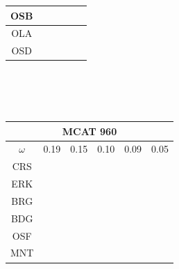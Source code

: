 \documentclass[12pt]{article}
\begin{document}
\begin{landscape}
\begin{figure}
{\begin{minipage}[c]{0.3\textwidth}
\begin{tabular}{|c|c|c|c|c|c|}
        OSB&\cellcolor[HTML]{FF7F00}&\cellcolor[HTML]{4DAF4A}&\cellcolor[HTML]{984EA3}&\cellcolor[HTML]{984EA3}&\cellcolor[HTML]{984EA3}\\ \hline %
        OLA&\cellcolor[HTML]{FF7F00}&\cellcolor[HTML]{4DAF4A}&\cellcolor[HTML]{984EA3}&\cellcolor[HTML]{984EA3}&\cellcolor[HTML]{984EA3}\\ \hline %
        OSD&\cellcolor[HTML]{FFFF33}&\cellcolor[HTML]{984EA3}&\cellcolor[HTML]{FF7F00}&\cellcolor[HTML]{FF7F00}&\cellcolor[HTML]{FF7F00}\\ \hline %
\end{tabular}\\$~$\\$~$\\
\begin{tabular}{|c|c|c|c|c|c|}%
         \hline \multicolumn{6}{|c|}{MCAT 960} \\ \hline
         $\omega$&0.19&0.15&0.10&0.09&0.05\\ \hline %
        CRS&\cellcolor[HTML]{E41A1C}&\cellcolor[HTML]{E41A1C}&\cellcolor[HTML]{E41A1C}&\cellcolor[HTML]{E41A1C}&\cellcolor[HTML]{E41A1C}\\ \hline %
        ERK&\cellcolor[HTML]{E41A1C}&\cellcolor[HTML]{E41A1C}&\cellcolor[HTML]{E41A1C}&\cellcolor[HTML]{E41A1C}&\cellcolor[HTML]{E41A1C}\\ \hline %
        BRG&\cellcolor[HTML]{E41A1C}&\cellcolor[HTML]{E41A1C}&\cellcolor[HTML]{E41A1C}&\cellcolor[HTML]{377EB8}&\cellcolor[HTML]{377EB8}\\ \hline %
        BDG&\cellcolor[HTML]{377EB8}&\cellcolor[HTML]{377EB8}&\cellcolor[HTML]{377EB8}&\cellcolor[HTML]{377EB8}&\cellcolor[HTML]{377EB8}\\ \hline %
        OSF&\cellcolor[HTML]{4DAF4A}&\cellcolor[HTML]{377EB8}&\cellcolor[HTML]{377EB8}&\cellcolor[HTML]{4DAF4A}&\cellcolor[HTML]{377EB8}\\ \hline %
        MNT&\cellcolor[HTML]{4DAF4A}&\cellcolor[HTML]{4DAF4A}&\cellcolor[HTML]{377EB8}&\cellcolor[HTML]{4DAF4A}&\cellcolor[HTML]{4DAF4A}\\ \hline %

\end{tabular}
\end{minipage}}
\end{figure}
\end{landscape}
\end{document}
